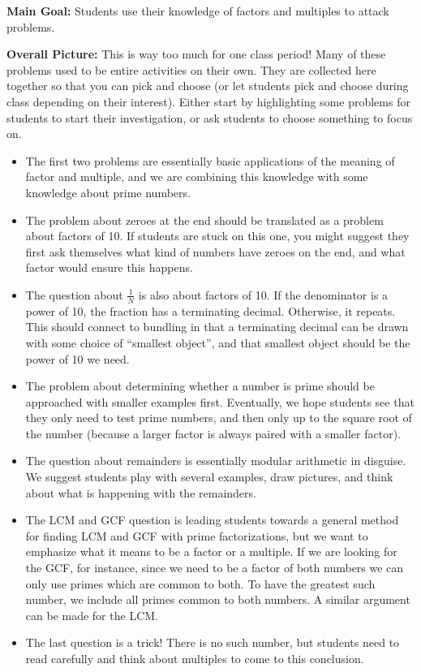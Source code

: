 \documentclass[nooutcomes,noauthor,handout]{ximera}
\begin{document}
\newpage
\begin{instructorNotes}

{\bf Main Goal:} Students use their knowledge of factors and multiples to attack problems.


{\bf Overall Picture:} This is way too much for one class period! Many of these problems used to be entire activities on their own. They are collected here together so that you can pick and choose (or let students pick and choose during class depending on their interest). Either start by highlighting some problems for students to start their investigation, or ask students to choose something to focus on.

\begin{itemize}
\item The first two problems are essentially basic applications of the meaning of factor and multiple, and we are combining this knowledge with some knowledge about prime numbers.
\item The problem about zeroes at the end should be translated as a problem about factors of 10. If students are stuck on this one, you might suggest they first ask themselves what kind of numbers have zeroes on the end, and what factor would ensure this happens.
\item The question about $\frac{1}{N}$ is also about factors of 10. If the denominator is a power of 10, the fraction has a terminating decimal. Otherwise, it repeats. This should connect to bundling in that a terminating decimal can be drawn with some choice of ``smallest object'', and that smallest object should be the power of 10 we need.
\item The problem about determining whether a number is prime should be approached with smaller examples first. Eventually, we hope students see that they only need to test prime numbers, and then only up to the square root of the number (because a larger factor is always paired with a smaller factor).
\item The question about remainders is essentially modular arithmetic in disguise. We suggest students play with several examples, draw pictures, and think about what is happening with the remainders.
\item The LCM and GCF question is leading students towards a general method for finding LCM and GCF with prime factorizations, but we want to emphasize what it means to be a factor or a multiple. If we are looking for the GCF, for instance, since we need to be a factor of both numbers we can only use primes which are common to both. To have the greatest such number, we include all primes common to both numbers. A similar argument can be made for the LCM.
\item The last question is a trick! There is no such number, but students need to read carefully and think about multiples to come to this conclusion.
\end{itemize}





\end{instructorNotes}
\end{document}
